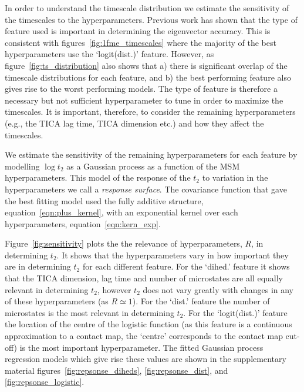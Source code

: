 \documentclass[journal=jacsat,manuscript=article]{achemso}
\begin{document}
In order to understand the timescale distribution we estimate the sensitivity of the timescales to the hyperparameters. Previous work has shown that the type of feature used is important in determining the eigenvector accuracy. This is consistent with figures~\ref{fig:1fme_timescales}  where the majority of the best hyperparameters use the `logit(dist.)' feature.  However, as figure~\ref{fig:ts_distribution} also shows that a) there is significant overlap of the timescale distributions for each feature, and b) the best performing feature also gives rise to the worst performing models. The type of feature is therefore a necessary but not sufficient hyperparameter to tune in order to maximize the timescales. It is important, therefore, to consider the remaining hyperparameters (e.g., the TICA lag time, TICA dimension etc.) and how they affect the timescales.  

We estimate the sensitivity of the remaining hyperparameters for each feature by modelling $\log{t_{2}}$ as a Gaussian process as a function of the MSM hyperparameters. This model of the response of the $t_2$ to variation in the hyperparameters we call a \emph{response surface}. The covariance function that gave the best fitting model used the fully additive structure, equation~\ref{eqn:plus_kernel}, with an exponential kernel over each hyperparameters, equation~\ref{eqn:kern_exp}. 

Figure~\ref{fig:sensitivity} plots the  the relevance of hyperparameters, $R$, in determining $t_{2}$. It shows that the hyperparameters vary in how important they are in determining $t_2$ for each different feature.  For the `dihed.' feature it shows that the TICA dimension, lag time and number of microstates are all equally relevant in determining $t_2$, however $t_2$ does not vary greatly with changes in any of these hyperparameters (as $R\simeq 1$). For the `dist.' feature the number of microstates is the most relevant in determining $t_2$. For the `logit(dist.)' feature the location of the centre of the logistic function (as this feature is a continuous approximation to a contact map, the `centre' corresponds  to the contact map cut-off) is the most important hyperparameter. The fitted Gaussian process regression models which give rise these values are shown in the supplementary material figures~\ref{fig:repsonse_diheds}, \ref{fig:repsonse_dist}, and \ref{fig:repsonse_logistic}. 
\end{document}
